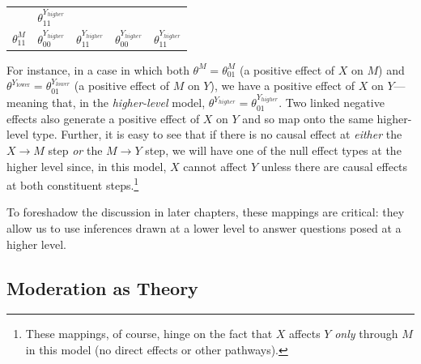\documentclass[12pt,]{book}
\let\rmarkdownfootnote\footnote%
\def\footnote{\protect\rmarkdownfootnote}
\begin{document}
\begin{longtable}[]{@{}lllll@{}}
\begin{minipage}[t]{0.18\columnwidth}
\end{minipage} & \begin{minipage}[t]{0.18\columnwidth}\raggedright
\(\theta_{11}^{Y_{higher}}\)\strut
\end{minipage}\tabularnewline
\begin{minipage}[t]{0.13\columnwidth}\raggedright
\(\theta_{11}^{M}\)\strut
\end{minipage} & \begin{minipage}[t]{0.18\columnwidth}\raggedright
\(\theta_{00}^{Y_{higher}}\)\strut
\end{minipage} & \begin{minipage}[t]{0.18\columnwidth}\raggedright
\(\theta_{11}^{Y_{higher}}\)\strut
\end{minipage} & \begin{minipage}[t]{0.18\columnwidth}\raggedright
\(\theta_{00}^{Y_{higher}}\)\strut
\end{minipage} & \begin{minipage}[t]{0.18\columnwidth}\raggedright
\(\theta_{11}^{Y_{higher}}\)\strut
\end{minipage}\tabularnewline
\bottomrule
\end{longtable}

For instance, in a case in which both \(\theta^M=\theta^M_{01}\) (a positive effect of \(X\) on \(M\)) and \(\theta^{Y_{\text{lower}}}=\theta_{01}^{Y_{lower}}\) (a positive effect of \(M\) on \(Y\)), we have a positive effect of \(X\) on \(Y\)---meaning that, in the \emph{higher-level} model, \(\theta^{Y_{higher}}=\theta^{Y_{higher}}_{01}\). Two linked negative effects also generate a positive effect of \(X\) on \(Y\) and so map onto the same higher-level type. Further, it is easy to see that if there is no causal effect at \emph{either} the \(X \rightarrow M\) step \emph{or} the \(M \rightarrow Y\) step, we will have one of the null effect types at the higher level since, in this model, \(X\) cannot affect \(Y\) unless there are causal effects at both constituent steps.\footnote{These mappings, of course, hinge on the fact that \(X\) affects \(Y\) \emph{only} through \(M\) in this model (no direct effects or other pathways).}

To foreshadow the discussion in later chapters, these mappings are critical: they allow us to use inferences drawn at a lower level to answer questions posed at a higher level.

\hypertarget{modtheory}{%
\subsection{Moderation as Theory}\label{modtheory}}
\end{document}
